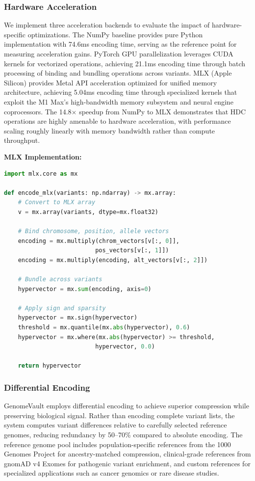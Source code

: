 \documentclass[11pt,letterpaper]{article}
\begin{document}
\subsubsection{Hardware Acceleration}

We implement three acceleration backends to evaluate the impact of hardware-specific optimizations. The NumPy baseline provides pure Python implementation with 74.6ms encoding time, serving as the reference point for measuring acceleration gains. PyTorch GPU parallelization leverages CUDA kernels for vectorized operations, achieving 21.1ms encoding time through batch processing of binding and bundling operations across variants. MLX (Apple Silicon) provides Metal API acceleration optimized for unified memory architecture, achieving 5.04ms encoding time through specialized kernels that exploit the M1 Max's high-bandwidth memory subsystem and neural engine coprocessors. The 14.8$\times$ speedup from NumPy to MLX demonstrates that HDC operations are highly amenable to hardware acceleration, with performance scaling roughly linearly with memory bandwidth rather than compute throughput.

\textbf{MLX Implementation:}
\begin{lstlisting}[language=Python,basicstyle=\ttfamily\small]
import mlx.core as mx

def encode_mlx(variants: np.ndarray) -> mx.array:
    # Convert to MLX array
    v = mx.array(variants, dtype=mx.float32)

    # Bind chromosome, position, allele vectors
    encoding = mx.multiply(chrom_vectors[v[:, 0]],
                          pos_vectors[v[:, 1]])
    encoding = mx.multiply(encoding, alt_vectors[v[:, 2]])

    # Bundle across variants
    hypervector = mx.sum(encoding, axis=0)

    # Apply sign and sparsity
    hypervector = mx.sign(hypervector)
    threshold = mx.quantile(mx.abs(hypervector), 0.6)
    hypervector = mx.where(mx.abs(hypervector) >= threshold,
                          hypervector, 0.0)

    return hypervector
\end{lstlisting}

\subsubsection{Differential Encoding}

GenomeVault employs differential encoding to achieve superior compression while preserving biological signal. Rather than encoding complete variant lists, the system computes variant differences relative to carefully selected reference genomes, reducing redundancy by 50--70\% compared to absolute encoding. The reference genome pool includes population-specific references from the 1000 Genomes Project for ancestry-matched compression, clinical-grade references from gnomAD v4 Exomes for pathogenic variant enrichment, and custom references for specialized applications such as cancer genomics or rare disease studies.
\end{document}
